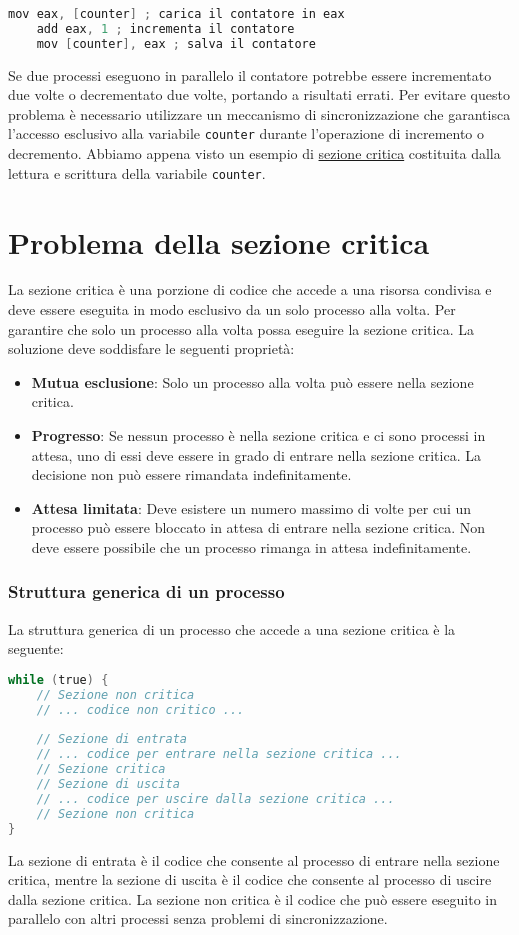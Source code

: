 \begin{lstlisting}[language=C, morekeywords={mov, eax, add}]
    mov eax, [counter] ; carica il contatore in eax
    add eax, 1 ; incrementa il contatore
    mov [counter], eax ; salva il contatore
\end{lstlisting}

    Se due processi eseguono in parallelo il contatore potrebbe essere incrementato due volte o decrementato due volte, portando a risultati errati. Per evitare questo problema è necessario utilizzare un meccanismo di sincronizzazione che garantisca l'accesso esclusivo alla variabile \texttt{counter} durante l'operazione di incremento o decremento. Abbiamo appena visto un esempio di \underline{sezione critica} costituita dalla lettura e scrittura della variabile \texttt{counter}.
\section{Problema della sezione critica}
    La sezione critica è una porzione di codice che accede a una risorsa condivisa e deve essere eseguita in modo esclusivo da un solo processo alla volta. Per garantire che solo un processo alla volta possa eseguire la sezione critica. La soluzione deve soddisfare le seguenti proprietà:
    \begin{itemize}
        \item \textbf{Mutua esclusione}: Solo un processo alla volta può essere nella sezione critica.
        \item \textbf{Progresso}: Se nessun processo è nella sezione critica e ci sono processi in attesa, uno di essi deve essere in grado di entrare nella sezione critica. La decisione non può essere rimandata indefinitamente.
        \item \textbf{Attesa limitata}: Deve esistere un numero massimo di volte per cui un processo può essere bloccato in attesa di entrare nella sezione critica. Non deve essere possibile che un processo rimanga in attesa indefinitamente.
    \end{itemize}
    \subsubsection{Struttura generica di un processo}
    La struttura generica di un processo che accede a una sezione critica è la seguente:
\begin{lstlisting}[language=C]
while (true) {
    // Sezione non critica
    // ... codice non critico ...
    
    // Sezione di entrata
    // ... codice per entrare nella sezione critica ...
    // Sezione critica
    // Sezione di uscita
    // ... codice per uscire dalla sezione critica ...
    // Sezione non critica
}
\end{lstlisting}
    La sezione di entrata è il codice che consente al processo di entrare nella sezione critica, mentre la sezione di uscita è il codice che consente al processo di uscire dalla sezione critica. La sezione non critica è il codice che può essere eseguito in parallelo con altri processi senza problemi di sincronizzazione.

